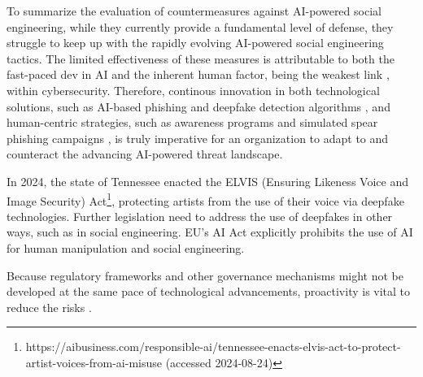To summarize the evaluation of countermeasures against AI-powered social engineering, while they currently provide a fundamental level of defense, they struggle to keep up with the rapidly evolving AI-powered social engineering tactics. The limited effectiveness of these measures is attributable to both the fast-paced dev in AI and the inherent human factor, being the weakest link \citep{mitnickArtDeceptionControlling2003}, within cybersecurity. Therefore, continous innovation in both technological solutions, such as AI-based phishing and deepfake detection algorithms \citep{mirskyTheCreationAndDetectionOfDeepfakes2021}, and human-centric strategies, such as awareness programs and simulated spear phishing campaigns \citep{salahdineSocialEngineeringAttacks2019}, is truly imperative for an organization to adapt to and counteract the advancing AI-powered threat landscape.

In 2024, the state of Tennessee enacted the ELVIS (Ensuring Likeness Voice and Image Security) Act\footnote{https://aibusiness.com/responsible-ai/tennessee-enacts-elvis-act-to-protect-artist-voices-from-ai-misuse (accessed 2024-08-24)}, protecting artists from the use of their voice via deepfake technologies. Further legislation need to address the use of deepfakes in other ways, such as in social engineering. EU's AI Act explicitly prohibits the use of AI for human  manipulation and social engineering.

Because regulatory frameworks and other governance mechanisms might not be developed at the same pace of technological advancements, proactivity is vital to reduce the risks \citep{blauthArtificialIntelligenceCrime2022}.
